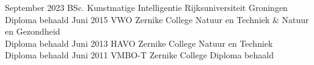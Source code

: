 \documentclass[9pt]{developercv} %
\begin{document}
\vspace{-10 pt}
\begin{entrylist}
    \entry
		{September 2023}
		{BSc. Kunstmatige Intelligentie}
		{Rijksuniversiteit Groningen}
		{Diploma behaald}
      \entry
        {Juni 2015}
		{VWO}
		{Zernike College}
		{Natuur en Techniek \& Natuur en Gezondheid \\ Diploma behaald}
    \entry
        {Juni 2013}
		{HAVO}
		{Zernike College}
		{Natuur en Techniek \\ Diploma behaald}
      \entry
        {Juni 2011}
		{VMBO-T}
		{Zernike College}
		{Diploma behaald}
\end{entrylist}
\end{document}
